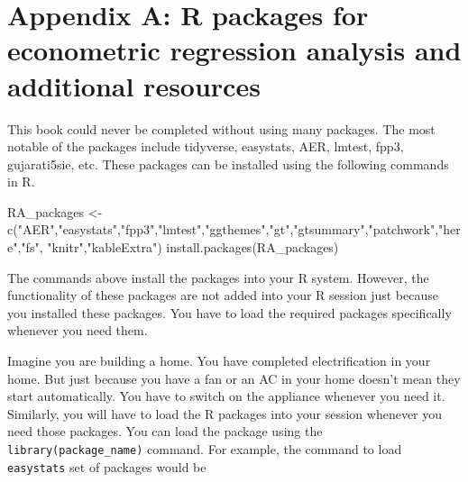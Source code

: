 \documentclass[
  letterpaper,
  twoside,
  openright,
  headsepline,
  footsepline,
  listof = totocnumbered,
  chapterprefix = true,
  titlepage = false]{scrbook}
\newenvironment{Shaded}{\begin{snugshade}}{\end{snugshade}}
\newcommand{\FunctionTok}[1]{\textcolor[rgb]{0.28,0.35,0.67}{#1}}
\newcommand{\NormalTok}[1]{\textcolor[rgb]{0.00,0.23,0.31}{#1}}
\newcommand{\OtherTok}[1]{\textcolor[rgb]{0.00,0.23,0.31}{#1}}
\newcommand{\StringTok}[1]{\textcolor[rgb]{0.13,0.47,0.30}{#1}}
\begin{document}
\cleardoublepage
{}
{}
\appendix

\hypertarget{appendix-a-r-packages-for-econometric-regression-analysis-and-additional-resources}{%
\chapter{Appendix A: R packages for econometric regression analysis and
additional
resources}\label{appendix-a-r-packages-for-econometric-regression-analysis-and-additional-resources}}

\setcounter{figure}{0} 
\renewcommand{\thefigure}{A.\arabic{figure}}
\setcounter{table}{0} 
\renewcommand{\thetable}{A.\arabic{table}}

This book could never be completed without using many packages. The most
notable of the packages include tidyverse, easystats, AER, lmtest, fpp3,
gujarati5sie, etc. These packages can be installed using the following
commands in R.

\begin{Shaded}
\begin{Highlighting}[numbers=left,,]
\NormalTok{RA\_packages }\OtherTok{\textless{}{-}} \FunctionTok{c}\NormalTok{(}\StringTok{"AER"}\NormalTok{,}\StringTok{"easystats"}\NormalTok{,}\StringTok{"fpp3"}\NormalTok{,}\StringTok{"lmtest"}\NormalTok{,}\StringTok{"ggthemes"}\NormalTok{,}\StringTok{"gt"}\NormalTok{,}\StringTok{"gtsummary"}\NormalTok{,}\StringTok{"patchwork"}\NormalTok{,}\StringTok{"here"}\NormalTok{,}\StringTok{"fs"}\NormalTok{, }\StringTok{"knitr"}\NormalTok{,}\StringTok{"kableExtra"}\NormalTok{)}
\FunctionTok{install.packages}\NormalTok{(RA\_packages)}
\end{Highlighting}
\end{Shaded}

The commands above install the packages into your R system. However, the
functionality of these packages are not added into your R session just
because you installed these packages. You have to load the required
packages specifically whenever you need them.

Imagine you are building a home. You have completed electrification in
your home. But just because you have a fan or an AC in your home doesn't
mean they start automatically. You have to switch on the appliance
whenever you need it. Similarly, you will have to load the R packages
into your session whenever you need those packages. You can load the
package using the \texttt{library(package\_name)} command. For example,
the command to load \texttt{easystats} set of packages would be
\end{document}
